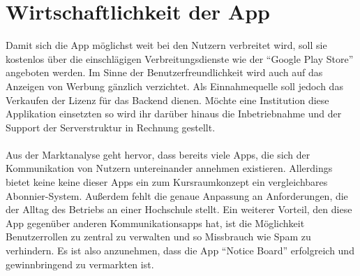 \begingroup
    \renewcommand{\clearpage}{}
    \chapter{Wirtschaftlichkeit der App}
  \endgroup
Damit sich die App möglichst weit bei den Nutzern verbreitet wird, soll sie kostenlos über die einschlägigen Verbreitungsdienste wie der \enquote{Google Play Store} angeboten werden.
Im Sinne der Benutzerfreundlichkeit wird auch auf das Anzeigen von Werbung gänzlich verzichtet.
Als Einnahmequelle soll jedoch das Verkaufen der Lizenz für das Backend dienen.
Möchte eine Institution diese Applikation einsetzten so wird ihr darüber hinaus die Inbetriebnahme und der Support der Serverstruktur in Rechnung gestellt.
\\
\\
Aus der Marktanalyse geht hervor, dass bereits viele Apps, die sich der Kommunikation von Nutzern untereinander annehmen existieren. 
Allerdings bietet keine keine dieser Apps ein zum Kursraumkonzept ein vergleichbares Abonnier-System. 
Außerdem fehlt die genaue Anpassung an Anforderungen, die der Alltag des Betriebs an einer Hochschule stellt.
Ein weiterer Vorteil, den diese App gegenüber anderen Kommunikationsapps hat, ist die Möglichkeit Benutzerrollen zu zentral zu verwalten und so Missbrauch wie Spam zu verhindern.
Es ist also anzunehmen, dass die App \enquote{Notice Board} erfolgreich und gewinnbringend zu vermarkten ist.